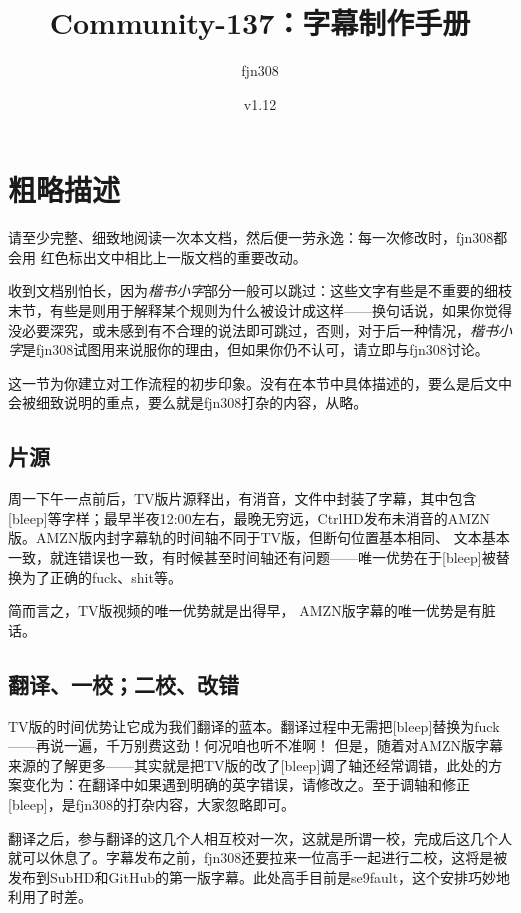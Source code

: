 \documentclass{ctexart}
\title{Community-137：字幕制作手册}
\author{fjn308}
\date{v1.12}
\begin{document}
\maketitle

\section{粗略描述}

请至少完整、细致地阅读一次本文档，然后便一劳永逸：每一次修改时，fjn308都会用{\color{red} 红色}标出文中相比上一版文档的重要改动。

收到文档别怕长，因为\emph{\small 楷书小字}部分一般可以跳过：这些文字有些是不重要的细枝末节，有些是则用于解释某个规则为什么被设计成这样——换句话说，如果你觉得没必要深究，或未感到有不合理的说法即可跳过，否则，对于后一种情况，\emph{\small 楷书小字}是fjn308试图用来说服你的理由，但如果你仍不认可，请立即与fjn308讨论。

这一节为你建立对工作流程的初步印象。没有在本节中具体描述的，要么是后文中会被细致说明的重点，要么就是fjn308打杂的内容，从略。

\subsection{片源}

周一下午一点前后，TV版片源释出，有消音，文件中封装了字幕，其中包含[bleep]等字样；最早半夜12:00左右，最晚无穷远，CtrlHD发布未消音的AMZN版。AMZN版内封字幕轨的时间轴不同于TV版，但断句位置基本相同、{\color{red} 文本基本一致，就连错误也一致，有时候甚至时间轴还有问题——唯一优势在于[bleep]被替换为了正确的fuck、shit等}。

简而言之，TV版视频的唯一优势就是出得早，{\color{red} AMZN版字幕的唯一优势是有脏话}。

\subsection{翻译、一校；二校、改错}\label{correction}

TV版的时间优势让它成为我们翻译的蓝本。翻译过程中无需把[bleep]替换为fuck——再说一遍，千万别费这劲！何况咱也听不准啊！{\color{red} 但是，随着对AMZN版字幕来源的了解更多——其实就是把TV版的改了[bleep]调了轴还经常调错，此处的方案变化为：在翻译中如果遇到明确的英字错误，请修改之}。至于调轴和修正[bleep]，是fjn308的打杂内容，大家忽略即可。

翻译之后，参与翻译的这几个人相互校对一次，这就是所谓一校，完成后这几个人就可以休息了。字幕发布之前，fjn308还要拉来一位高手一起进行二校，这将是被发布到SubHD和GitHub的第一版字幕。此处高手目前是se9fault，这个安排巧妙地利用了时差。
\end{document}
